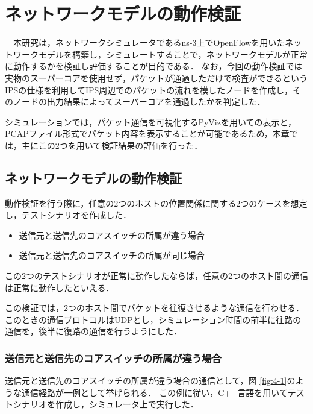 \chapter{ネットワークモデルの動作検証}

　本研究は，ネットワークシミュレータであるns-3上でOpenFlowを用いたネットワークモデルを構築し，シミュレートすることで，ネットワークモデルが正常に動作するかを検証し評価することが目的である．
なお，今回の動作検証では実物のスーパーコアを使用せず，パケットが通過しただけで検査ができるというIPSの仕様を利用してIPS周辺でのパケットの流れを模したノードを作成し，そのノードの出力結果によってスーパーコアを通過したかを判定した．

シミュレーションでは，パケット通信を可視化するPyVizを用いての表示と，PCAPファイル形式でパケット内容を表示することが可能であるため，本章では，主にこの2つを用いて検証結果の評価を行った．

\section{ネットワークモデルの動作検証}

動作検証を行う際に，任意の2つのホストの位置関係に関する2つのケースを想定し，テストシナリオを作成した．

\begin{itemize}
	\item 送信元と送信先のコアスイッチの所属が違う場合
	\item 送信元と送信先のコアスイッチの所属が同じ場合
\end{itemize}

この2つのテストシナリオが正常に動作したならば，任意の2つのホスト間の通信は正常に動作したといえる．

この検証では，2つのホスト間でパケットを往復させるような通信を行わせる．
このときの通信プロトコルはUDPとし，シミュレーション時間の前半に往路の通信を，後半に復路の通信を行うようにした．

\subsection{送信元と送信先のコアスイッチの所属が違う場合}

送信元と送信先のコアスイッチの所属が違う場合の通信として，図 \ref{fig:4-1}のような通信経路が一例として挙げられる．
この例に従い，C++言語を用いてテストシナリオを作成し，シミュレータ上で実行した．


